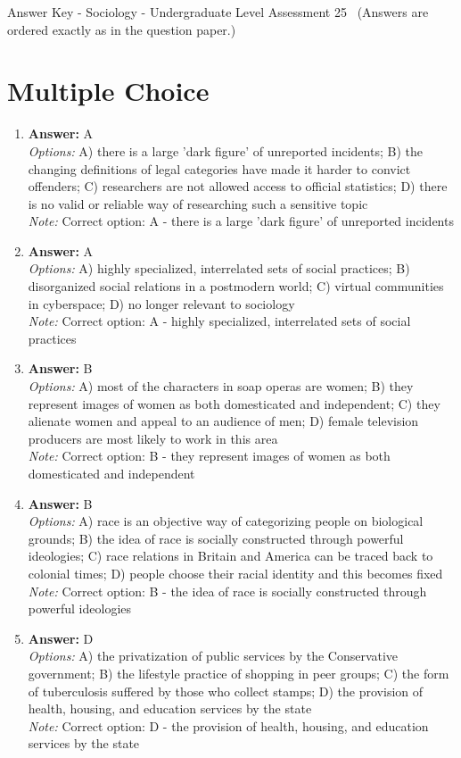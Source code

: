 \documentclass[12pt]{article}
\begin{document}
\begin{center}
Answer Key - Sociology - Undergraduate Level Assessment 25 \
\small (Answers are ordered exactly as in the question paper.)
\end{center}

\section*{Multiple Choice}
\begin{enumerate}[label=\arabic*.]
\item \textbf{Answer:} A
\\ \textit{Options:} A) there is a large 'dark figure' of unreported incidents; B) the changing definitions of legal categories have made it harder to convict offenders; C) researchers are not allowed access to official statistics; D) there is no valid or reliable way of researching such a sensitive topic
\\ \textit{Note:} Correct option: A - there is a large 'dark figure' of unreported incidents
\item \textbf{Answer:} A
\\ \textit{Options:} A) highly specialized, interrelated sets of social practices; B) disorganized social relations in a postmodern world; C) virtual communities in cyberspace; D) no longer relevant to sociology
\\ \textit{Note:} Correct option: A - highly specialized, interrelated sets of social practices
\item \textbf{Answer:} B
\\ \textit{Options:} A) most of the characters in soap operas are women; B) they represent images of women as both domesticated and independent; C) they alienate women and appeal to an audience of men; D) female television producers are most likely to work in this area
\\ \textit{Note:} Correct option: B - they represent images of women as both domesticated and independent
\item \textbf{Answer:} B
\\ \textit{Options:} A) race is an objective way of categorizing people on biological grounds; B) the idea of race is socially constructed through powerful ideologies; C) race relations in Britain and America can be traced back to colonial times; D) people choose their racial identity and this becomes fixed
\\ \textit{Note:} Correct option: B - the idea of race is socially constructed through powerful ideologies
\item \textbf{Answer:} D
\\ \textit{Options:} A) the privatization of public services by the Conservative government; B) the lifestyle practice of shopping in peer groups; C) the form of tuberculosis suffered by those who collect stamps; D) the provision of health, housing, and education services by the state
\\ \textit{Note:} Correct option: D - the provision of health, housing, and education services by the state
\end{enumerate}
\end{document}
